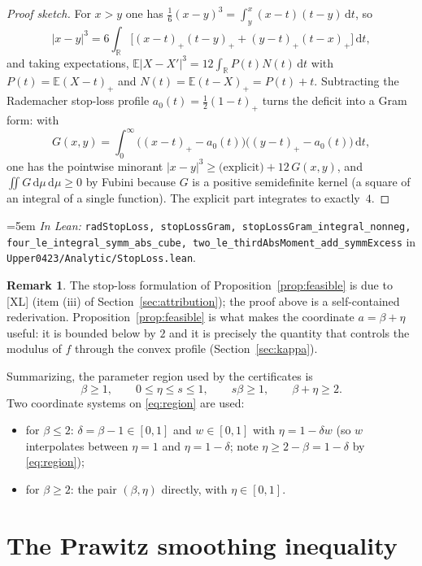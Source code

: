 \documentclass[11pt,a4paper]{article}
\theoremstyle{definition}
\newtheorem{remark}[theorem]{Remark}
\newcommand{\RR}{\mathbb{R}}
\newcommand{\EE}{\mathbb{E}}
\newcommand{\dd}{\,\mathrm{d}}
\newcommand{\Lean}[1]{\texttt{#1}}
\newcommand{\file}[1]{\texttt{#1}}
\newcommand{\formal}[2]{%
  \par\smallskip
  \begingroup\small\raggedright\emergencystretch=5em
  \noindent\textit{In Lean:} \Lean{#1} in \file{#2}.\par
  \endgroup\smallskip}
\begin{document}
\begin{proof}[Proof sketch]
  For $x>y$ one has $\tfrac16(x-y)^3=\int_y^x(x-t)(t-y)\dd t$, so
  \[
    |x-y|^3
    =6\int_\RR\bigl[(x-t)_+(t-y)_+ + (y-t)_+(t-x)_+\bigr]\dd t ,
  \]
  and taking expectations,
  $\EE|X-X'|^3=12\int_\RR P(t)N(t)\dd t$ with $P(t)=\EE(X-t)_+$ and
  $N(t)=\EE(t-X)_+=P(t)+t$. Subtracting the Rademacher stop-loss profile
  $a_0(t)=\tfrac12(1-t)_+$ turns the deficit into a Gram form: with
  \[
    G(x,y)=\int_0^\infty\bigl((x-t)_+-a_0(t)\bigr)\bigl((y-t)_+-a_0(t)\bigr)\dd t ,
  \]
  one has the pointwise minorant $|x-y|^3\ge \text{(explicit)}+12\,G(x,y)$, and
  $\iint G\dd\mu\dd\mu\ge0$ by Fubini because $G$ is a positive semidefinite
  kernel (a square of an integral of a single function). The explicit part
  integrates to exactly~$4$.
\end{proof}
\formal{radStopLoss, stopLossGram, stopLossGram\_integral\_nonneg, four\_le\_integral\_symm\_abs\_cube, two\_le\_thirdAbsMoment\_add\_symmExcess}{Upper0423/Analytic/StopLoss.lean}

\begin{remark}
  The stop-loss formulation of Proposition~\ref{prop:feasible} is due to [XL]
  (item (iii) of Section~\ref{sec:attribution}); the proof above is a
  self-contained rederivation. Proposition~\ref{prop:feasible} is what makes the
  coordinate $a=\beta+\eta$ useful: it is bounded below by $2$ and it is
  precisely the quantity that controls the modulus of $f$ through the convex
  profile (Section~\ref{sec:kappa}).
\end{remark}

Summarizing, the parameter region used by the certificates is
\begin{equation}
  \label{eq:region}
  \beta\ge1,\qquad 0\le\eta\le s\le1,\qquad s\beta\ge1,\qquad \beta+\eta\ge2 .
\end{equation}
Two coordinate systems on \eqref{eq:region} are used:
\begin{itemize}[leftmargin=1.6em]
\item for $\beta\le2$: $\delta=\beta-1\in[0,1]$ and $w\in[0,1]$ with
  $\eta=1-\delta w$ (so $w$ interpolates between $\eta=1$ and $\eta=1-\delta$;
  note $\eta\ge 2-\beta=1-\delta$ by \eqref{eq:region});
\item for $\beta\ge2$: the pair $(\beta,\eta)$ directly, with $\eta\in[0,1]$.
\end{itemize}

\section{The Prawitz smoothing inequality}
\label{sec:prawitz}
\end{document}
